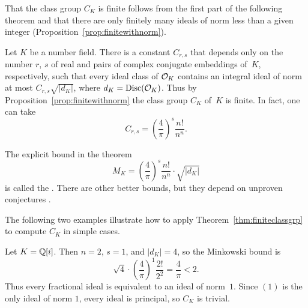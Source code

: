 That the class group $C_K$ is finite follows from the first part of
the following theorem and that there are only finitely many
ideals of norm less than a given integer (Proposition~\ref{prop:finitewithnorm}).
\begin{theorem}\label{thm:finiteclassgrp}
	Let $K$ be a number field.  There is a constant $C_{r,s}$ that
	depends only on the number $r$, $s$ of real and pairs
	of complex conjugate embeddings of~$K$, respectively, such that
	every ideal class of $\mathcal{O}_K$ contains an integral ideal
	of norm at most $C_{r,s}\sqrt{|d_K|}$, where $d_K=\operatorname{Disc}(\mathcal{O}_K)$.
	Thus by Proposition~\ref{prop:finitewithnorm}
	the class group $C_K$ of~$K$ is finite. In fact, one can take
	$$
		C_{r,s} = \left(\frac{4}{\pi}\right)^s\frac{n!}{n^n}.
	$$
\end{theorem}
The explicit bound in the theorem
$$
	M_K = \left(\frac{4}{\pi}\right)^s\frac{n!}{n^n} \cdot \sqrt{|d_K|}
$$
is called the .
There are other better bounds, but they depend on unproven conjectures
\cite{bach1990explicit}.

The following two examples illustrate how to apply
Theorem~\ref{thm:finiteclassgrp} to compute $C_K$ in simple cases.
\begin{example}
	Let $K=\mathbb{Q}[i]$.  Then $n=2$, $s=1$, and $|d_K|=4$, so the Minkowski bound is
	$$
		\sqrt{4} \cdot \left(\frac{4}{\pi}\right)^1 \frac{2!}{2^2}
		= \frac{4}{\pi} < 2.
	$$
	Thus every fractional ideal is equivalent to an ideal of norm~$1$.
	Since $(1)$ is the only ideal of norm $1$, every ideal is principal,
	so $C_K$ is trivial.
\end{example}

